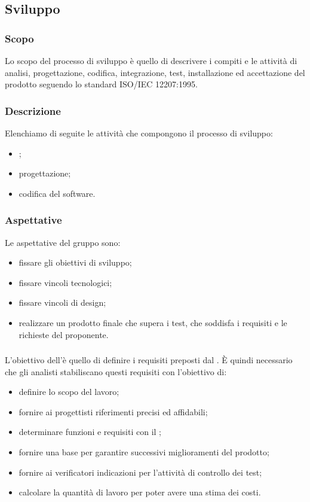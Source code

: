 \subsection{Sviluppo}
\subsubsection{Scopo}
Lo scopo del processo di sviluppo è quello di descrivere i compiti e le attività di analisi, progettazione, codifica, integrazione, test, installazione ed accettazione del prodotto seguendo lo standard ISO/IEC 12207:1995.

\subsubsection{Descrizione}
Elenchiamo di seguite le attività che compongono il processo di sviluppo:
\begin{itemize}
    \item \AdR{};
    \item progettazione;
    \item codifica del software.
\end{itemize}

\subsubsection{Aspettative}
Le aspettative del gruppo sono:
\begin{itemize}
    \item fissare gli obiettivi di sviluppo;
    \item fissare vincoli tecnologici;
    \item fissare vincoli di design;
    \item realizzare un prodotto finale che supera i test, che soddisfa i requisiti e le richieste del proponente.
\end{itemize}

\subsubsection{\AdR{}}
L'obiettivo dell'\AdRv{}è quello di definire i requisiti preposti dal \proponProg{}. È quindi necessario che gli analisti stabiliscano questi requisiti con l'obiettivo di:
\begin{itemize}
    \item definire lo scopo del lavoro;
    \item fornire ai progettisti riferimenti precisi ed affidabili;
    \item determinare funzioni e requisiti con il \proponProg;
    \item fornire una base per garantire successivi miglioramenti del prodotto;
    \item fornire ai verificatori indicazioni per l'attività di controllo dei test;
    \item calcolare la quantità di lavoro per poter avere una stima dei costi.
\end{itemize}







